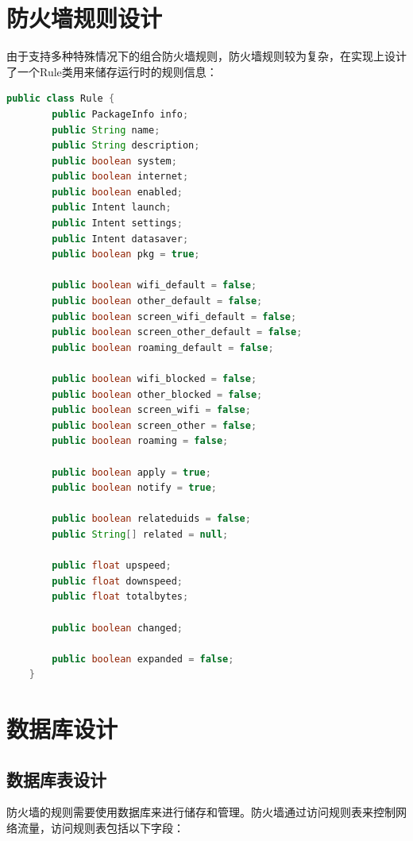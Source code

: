 \documentclass[format=final, language=chinese, degree=fyp]{hustthesis}
\begin{document}
\section{防火墙规则设计}

由于支持多种特殊情况下的组合防火墙规则，防火墙规则较为复杂，在实现上设计了一个Rule类用来储存运行时的规则信息：

\begin{lstlisting}[language=java]
    public class Rule {
        public PackageInfo info;
        public String name;
        public String description;
        public boolean system;
        public boolean internet;
        public boolean enabled;
        public Intent launch;
        public Intent settings;
        public Intent datasaver;
        public boolean pkg = true;

        public boolean wifi_default = false;
        public boolean other_default = false;
        public boolean screen_wifi_default = false;
        public boolean screen_other_default = false;
        public boolean roaming_default = false;

        public boolean wifi_blocked = false;
        public boolean other_blocked = false;
        public boolean screen_wifi = false;
        public boolean screen_other = false;
        public boolean roaming = false;

        public boolean apply = true;
        public boolean notify = true;

        public boolean relateduids = false;
        public String[] related = null;

        public float upspeed;
        public float downspeed;
        public float totalbytes;

        public boolean changed;

        public boolean expanded = false;
    }
\end{lstlisting}

\section{数据库设计}

\subsection{数据库表设计}
防火墙的规则需要使用数据库来进行储存和管理。防火墙通过访问规则表来控制网络流量，访问规则表包括以下字段：
\end{document}

